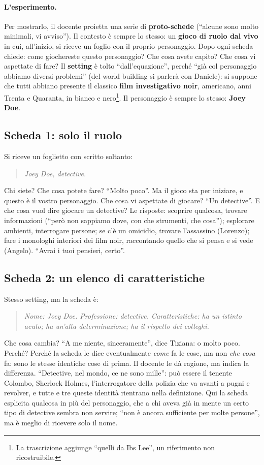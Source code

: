 \paragraph{L'esperimento.} Per mostrarlo, il docente proietta una serie di
\textbf{proto-schede} (``alcune sono molto minimali, vi avviso''). Il contesto è
sempre lo stesso: un \textbf{gioco di ruolo dal vivo} in cui, all'inizio, si
riceve un foglio con il proprio personaggio. Dopo ogni scheda chiede: come
giochereste questo personaggio? Che cosa avete capito? Che cosa vi aspettate di
fare? Il \textbf{setting} è tolto ``dall'equazione'', perché ``già col personaggio
abbiamo diversi problemi'' (del world building si parlerà con Daniele): si
suppone che tutti abbiano presente il classico \textbf{film investigativo noir},
americano, anni Trenta e Quaranta, in bianco e nero\footnote{La trascrizione
aggiunge ``quelli da Ibs Lee'', un riferimento non ricostruibile.}. Il personaggio è
sempre lo stesso: \textbf{Joey Doe}.

\subsection{Scheda 1: solo il ruolo}

Si riceve un foglietto con scritto soltanto:
\begin{quote}
\emph{Joey Doe, detective.}
\end{quote}
Chi siete? Che cosa potete fare? ``Molto poco''. Ma il gioco sta per iniziare, e
questo è il vostro personaggio. Che cosa vi aspettate di giocare? ``Un detective''.
E che cosa vuol dire giocare un detective? Le risposte: scoprire qualcosa, trovare
informazioni (``però non sappiamo dove, con che strumenti, che cosa''); esplorare
ambienti, interrogare persone; se c'è un omicidio, trovare l'assassino (Lorenzo);
fare i monologhi interiori dei film noir, raccontando quello che si pensa e si
vede (Angelo). ``Avrai i tuoi pensieri, certo''.

\subsection{Scheda 2: un elenco di caratteristiche}

Stesso setting, ma la scheda è:
\begin{quote}
\emph{Nome: Joey Doe. Professione: detective. Caratteristiche: ha un istinto
acuto; ha un'alta determinazione; ha il rispetto dei colleghi.}
\end{quote}
Che cosa cambia? ``A me niente, sinceramente'', dice Tiziana: o molto poco. Perché?
Perché la scheda le dice eventualmente \emph{come} fa le cose, ma non \emph{che
cosa} fa: sono le stesse identiche cose di prima. Il docente le dà ragione, ma
indica la differenza. ``Detective, nel mondo, ce ne sono mille'': può essere il
tenente Colombo, Sherlock Holmes, l'interrogatore della polizia che va avanti a
pugni e revolver, e tutte e tre queste identità rientrano nella definizione. Qui la
scheda esplicita qualcosa in più del personaggio, che a chi aveva già in mente un
certo tipo di detective sembra non servire; ``non è ancora sufficiente per molte
persone'', ma è meglio di ricevere solo il nome.

